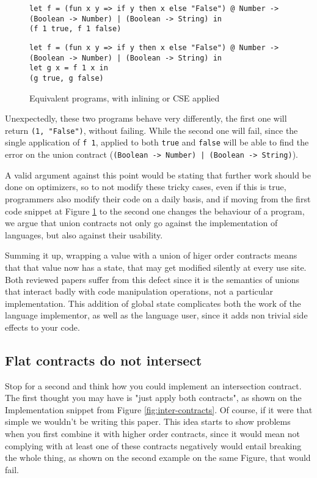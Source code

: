 \documentclass[sigplan,10pt,review,anonymous]{acmart}
\newcommand{\nickel}[1]{\lstinline[language=nickel]{#1}}
\begin{document}
\begin{figure}[h]
\begin{lstlisting}[language=nickel, title=Inlined]
let f = (fun x y => if y then x else "False") @ Number -> (Boolean -> Number) | (Boolean -> String) in
(f 1 true, f 1 false)
\end{lstlisting}
\begin{lstlisting}[language=nickel, title=Common Subexpression Eliminated]
let f = (fun x y => if y then x else "False") @ Number -> (Boolean -> Number) | (Boolean -> String) in
let g x = f 1 x in
(g true, g false)
\end{lstlisting}
\caption{Equivalent programs, with inlining or CSE applied}
\label{fig:optimized-programs}
\end{figure}

Unexpectedly, these two programs behave very differently, the first one will return
\nickel{(1, "False")}, without failing.
While the second one will fail, since the single application of \nickel{f 1},
applied to both \nickel{true} and \nickel{false} will be able to find the error
on the union contract (\nickel{(Boolean -> Number) | (Boolean -> String)}).

A valid argument against this point would be stating that further work should be done
on optimizers, so to not modify these tricky cases, even if this is true,
programmers also modify their code on a daily basis, and if moving from the first
code snippet at Figure \ref{fig:optimized-programs} to the second one changes
the behaviour of a program, we argue that union contracts not only go against the
implementation of languages, but also against their usability.

Summing it up, wrapping a value with a union of higer order contracts means that
that value now has a state, that may get modified silently at every use site.
Both reviewed papers suffer from this defect since it is the semantics
of unions that interact badly with code manipulation operations,
not a particular implementation.
This addition of global state complicates both the work of the language
implementor, as well as the language user, since it adds non trivial
side effects to your code.


\subsection*{Flat contracts do not intersect}
\label{sec:flat-and-inter}

Stop for a second and think how you could implement an intersection
contract. The first thought you may have is "just apply
both contracts", as shown on the Implementation snippet
from Figure \ref{fig:inter-contracts}.
Of course, if it were that simple we wouldn't be writing this paper.
This idea starts to show problems when you first combine it with
higher order contracts, since it would mean not complying with
at least one of these contracts negatively would entail breaking the
whole thing, as shown on the second example on the same Figure,
that would fail.
\end{document}
